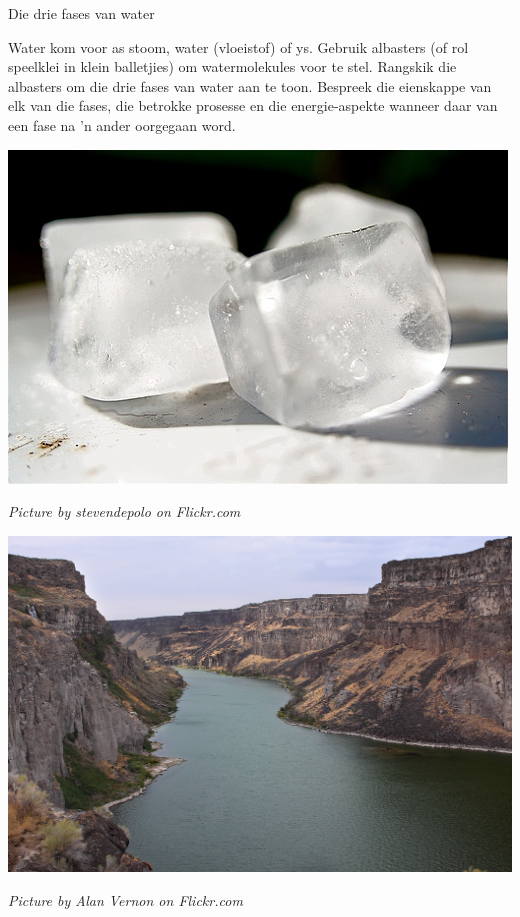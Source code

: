 \begin{activity}{Die drie fases van water}
\begin{minipage}{0.5\textwidth}
Water kom voor as stoom, water (vloeistof) of ys. Gebruik albasters (of rol speelklei in klein balletjies) om watermolekules voor te stel. Rangskik die albasters om die drie fases van water aan te toon. Bespreek die eienskappe van elk van die fases, die betrokke prosesse en die energie-aspekte wanneer daar van een fase na  'n ander oorgegaan word.
\end{minipage}
\begin{minipage}{.5\textwidth}
\begin{center}
 \includegraphics[width=.3\textwidth]{photos/iceby-stevendepolo-flickr.jpg}\par
\textit{Picture by stevendepolo on Flickr.com}
\end{center}
\begin{center}
 \includegraphics[width=.3\textwidth]{photos/AlanVernon.jpg}\par
\textit{Picture by Alan Vernon on Flickr.com}
\end{center}
\end{minipage}
\end{activity}

      
\label{m38730*cid7}

